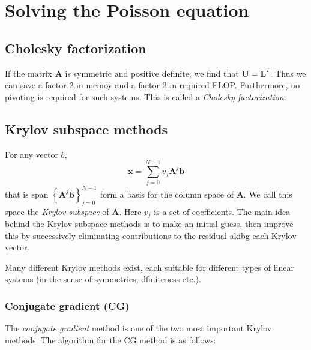
\section{Solving the Poisson equation} %
\label{sec:solution_methods}

\subsection{Cholesky factorization} %
\label{sub:banded_cholesky}

If the matrix $\mathbf{A}$ is symmetric and positive definite, we find that $\mathbf{U}=\mathbf{L}^T$. Thus we can save a factor 2 in memoy and a factor 2 in required FLOP. Furthermore, no pivoting is required for such systems. This is called a \emph{Cholesky factorization}.



\subsection{Krylov subspace methods} %
\label{sub:krylov_subspace_methods}
For any vector $b$,
\begin{equation}
  \mathbf{x} = \sum_{j=0}^{N-1} v_j \mathbf{A}^j \mathbf{b}
\end{equation}
that is span $\left\{ \mathbf{A}^j \mathbf{b} \right\}_{j=0}^{N-1}$ form a basis for the column space of $\mathbf{A}$. We call this space the \emph{Krylov subspace} of $\mathbf{A}$. Here $v_j$ is a set of coefficients. The main idea behind the Krylov subspace methods is to make an initial guess, then improve this by successively  eliminating contributions to the residual akibg each Krylov vector.

Many different Krylov methods exist, each suitable for different types of linear systems (in the sense of symmetries, dfiniteness etc.).

\subsubsection{Conjugate gradient (CG)} %
\label{ssub:conjugate_gradient}

The \emph{conjugate gradient} method is one of the two most important Krylov methods. The algorithm for the CG method is as follows:

